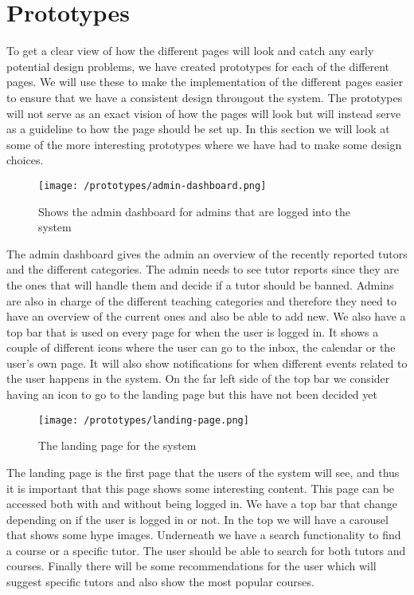 \section{Prototypes}
To get a clear view of how the different pages will look and catch any early potential design problems, we have created prototypes for each of the different pages. 
We will use these to make the implementation of the different pages easier to ensure that we have a consistent design througout the system. 
The prototypes will not serve as an exact vision of how the pages will look but will instead serve as a guideline to how the page should be set up.
In this section we will look at some of the more interesting prototypes where we have had to make some design choices.
\begin{figure}[H]
    \texttt{[image: /prototypes/admin-dashboard.png]}
     \caption{Shows the admin dashboard for admins that are logged into the system}
     \label{fig:admin-dashboard}
 \end{figure}
The admin dashboard gives the admin an overview of the recently reported tutors and the different categories. 
The admin needs to see tutor reports since they are the ones that will handle them and decide if a tutor should be banned. 
Admins are also in charge of the different teaching categories and therefore they need to have an overview of the current ones and also be able to add new.
We also have a top bar that is used on every page for when the user is logged in. It shows a couple of different icons where the user can go to the inbox, the calendar or the user's own page. It will also show notifications for when different events related to the user happens in the system. On the far left side of the top bar we consider having an icon to go to the landing page but this have not been decided yet
\begin{figure}[H]
   \texttt{[image: /prototypes/landing-page.png]}
    \caption{The landing page for the system}
    \label{fig:landing-page}
\end{figure}
The landing page is the first page that the users of the system will see, and thus it is important that this page shows some interesting content. 
This page can be accessed both with and without being logged in. 
We have a top bar that change depending on if the user is logged in or not. 
In the top we will have a carousel that shows some hype images.
Underneath we have a search functionality to find a course or a specific tutor. 
The user should be able to search for both tutors and courses. 
Finally there will be some recommendations for the user which will suggest specific tutors and also show the most popular courses. 

